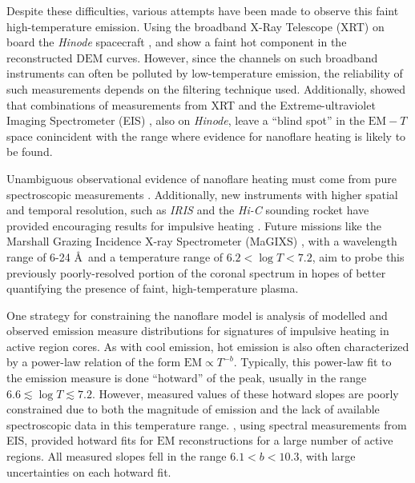 \documentclass[apj]{emulateapj}
\newcommand{\ang}{\AA~}
\begin{document}
	\par Despite these difficulties, various attempts have been made to observe this faint high-temperature emission. Using the broadband X-Ray Telescope (XRT) \citep{golub_x-ray_2007} on board the \textit{Hinode} spacecraft \citep{kosugi_hinode_2007}, \citet{schmelz_hinode_2009} and \citet{reale_evidence_2009} show a faint hot component in the reconstructed $\mathrm{DEM}$ curves. However, since the channels on such broadband instruments can often be polluted by low-temperature emission, the reliability of such measurements depends on the filtering technique used. Additionally, \citet{winebarger_defining_2012} showed that combinations of measurements from XRT and the Extreme-ultraviolet Imaging Spectrometer (EIS) \citep{culhane_euv_2007}, also on  \textit{Hinode}, leave a ``blind spot'' in the $\mathrm{EM}-T$ space conincident with the range where evidence for nanoflare heating is likely to be found. 
	\par Unambiguous observational evidence of nanoflare heating must come from pure spectroscopic measurements \citep[see][]{brosius_pervasive_2014}. Additionally, new instruments with higher spatial and temporal resolution, such as \textit{IRIS} \citep{de_pontieu_interface_2014} and the \textit{Hi-C} sounding rocket \citep{cirtain_energy_2013} have provided encouraging results for impulsive heating \citep{testa_observing_2013,testa_evidence_2014}. Future missions like the Marshall Grazing Incidence X-ray Spectrometer (MaGIXS) \citep{kobayashi_marshall_2011,winebarger_new_2014}, with a wavelength range of 6-24 \ang and a temperature range of $6.2<\log{T}<7.2$, aim to probe this previously poorly-resolved portion of the coronal spectrum in hopes of better quantifying the presence of faint, high-temperature plasma.
	\par One strategy for constraining the nanoflare model is analysis of modelled and observed emission measure distributions for signatures of impulsive heating in active region cores. As with cool emission, hot emission is also often characterized by a power-law relation of the form $\mathrm{EM}\propto T^{-b}$. Typically, this power-law fit to the emission measure is done ``hotward'' of the peak, usually in the range $6.6\lesssim\log{T}\lesssim7.2$. However, measured values of these hotward slopes are poorly constrained due to both the magnitude of emission and the lack of available spectroscopic data in this temperature range. \citet{warren_systematic_2012}, using spectral measurements from EIS, provided hotward fits for $\mathrm{EM}$ reconstructions for a large number of active regions. All measured slopes fell in the range $6.1<b<10.3$, with large uncertainties on each hotward fit.
\end{document}
